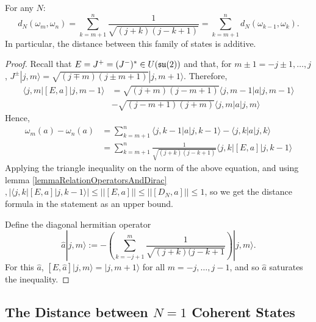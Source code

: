 \begin{theorem}\label{theoremDistanceDiscreteStates}
For any $N$:
\begin{equation}
    d_N(\omega_m, \omega_n) = \sum_{k = m+1}^n \frac{1}{\sqrt{(j+k)(j-k+1)}} = \sum_{k = m+1}^n d_N(\omega_{k-1}, \omega_k).
\end{equation}
In particular, the distance between this family of states is additive.
\end{theorem}

\begin{proof}
Recall that $E = J^+ = (J^-)^* \in U(\mathfrak{su}(2))$ and that, for $m \pm 1 = -j\pm 1, \dots, j$, $J^\pm|j,m\rangle = \sqrt{(j\mp m)(j\pm m + 1)}|j, m+1 \rangle$. Therefore, 
\begin{align*}
    \langle j, m | [E, a] |j, m - 1 \rangle &= \sqrt{(j+m)(j-m+1)} \langle j, m-1| a | j, m-1\rangle \\
    & -\sqrt{(j-m+1)(j+m)} \langle j, m| a | j, m\rangle
\end{align*}
Hence, 
\begin{align*}
    \omega_m(a) - \omega_n(a) &= \sum_{k = m+1}^n \langle j, k-1 |a|j, k-1 \rangle - \langle j, k |a| j, k \rangle \\
    &= \sum_{k = m+1}^n \frac{1}{\sqrt{(j+k)(j-k+1)}} \langle j, k| [E, a] |j, k-1 \rangle
\end{align*}
Applying the triangle inequality on the norm of the above equation, and using lemma \ref{lemmaRelationOperatorsAndDirac}$, |\langle j, k |[E, a]|j, k-1 \rangle|  \leq ||[E, a]|| \leq ||[D_N, a]|| \leq 1$, so we get the distance formula in the statement as an upper bound. 

Define the diagonal hermitian operator 
\begin{equation}\label{saturatingDiagonalADiscreteBasis}
    \hat a |j, m\rangle := - \left( \sum_{k = -j+1}^m \frac{1}{\sqrt{(j+k)(j-k+1}}  \right)|j, m\rangle.    
\end{equation} 
For this $\hat a$, $[E, \hat a] |j, m \rangle = |j, m+1\rangle$ for all $m = -j, \dots, j-1$, and so $\hat a$ saturates the inequality.
\end{proof}


\subsection{The Distance between $N=1$ Coherent States}

 
